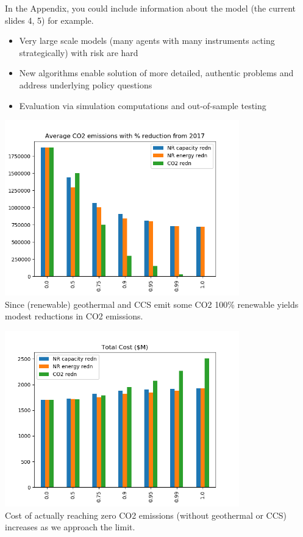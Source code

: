 \documentclass[xcolor=dvipsnames]{beamer}
\begin{document}
\appendix

\begin{frame}
In the Appendix, you could include information about the model (the
current slides 4, 5) for example.
\begin{itemize}
  \item \color{black} Very large scale models (many agents with many instruments
    acting strategically) with risk are hard
  \item \alert{New algorithms enable solution of more detailed,
      authentic problems and address underlying policy questions}
  \item Evaluation via simulation computations and out-of-sample testing
\end{itemize}
\end{frame}

\begin{frame}
  \centering
  \includegraphics[width=4.0in]{includes/TotalCarbonv20.png} \\
  Since (renewable) geothermal and CCS emit some CO2 100\% renewable yields modest reductions in CO2 emissions.
\end{frame}

\begin{frame}

  \centering
  \includegraphics[width=4.0in]{includes/TotalCostMv20.png} \\
  Cost of actually reaching zero CO2 emissions (without geothermal or CCS) increases as we approach the limit.
\end{frame}
\end{document}
